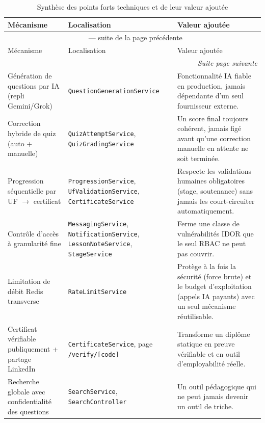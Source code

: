 \begin{center}
  \footnotesize
  \begin{longtable}{|p{2.6cm}|p{4.1cm}|p{6.3cm}|}
    \caption{Synthèse des points forts techniques et de leur valeur ajoutée}
    \label{tab:synthese-points-forts}\\
    \hline
    Mécanisme & Localisation & Valeur ajoutée \\
    \hline
    \endfirsthead
    \multicolumn{3}{c}{\tablename~\thetable{} --- suite de la page précédente}\\
    \hline
    Mécanisme & Localisation & Valeur ajoutée \\
    \hline
    \endhead
    \hline \multicolumn{3}{r}{\textit{Suite page suivante}} \\
    \endfoot
    \hline
    \endlastfoot
    Génération de questions par IA (repli Gemini/Grok) & \texttt{Question\allowbreak Generation\allowbreak Service} & Fonctionnalité IA fiable en production, jamais dépendante d'un seul fournisseur externe. \\ \hline
    Correction hybride de quiz (auto + manuelle) & \texttt{QuizAttempt\allowbreak Service}, \texttt{QuizGrading\allowbreak Service} & Un score final toujours cohérent, jamais figé avant qu'une correction manuelle en attente ne soit terminée. \\ \hline
    Progression séquentielle par UF $\rightarrow$ certificat & \texttt{Progression\allowbreak Service}, \texttt{UfValidation\allowbreak Service}, \texttt{Certificate\allowbreak Service} & Respecte les validations humaines obligatoires (stage, soutenance) sans jamais les court-circuiter automatiquement. \\ \hline
    Contrôle d'accès à granularité fine & \texttt{Messaging\allowbreak Service}, \texttt{Notification\allowbreak Service}, \texttt{LessonNote\allowbreak Service}, \texttt{Stage\allowbreak Service} & Ferme une classe de vulnérabilités IDOR que le seul RBAC ne peut pas couvrir. \\ \hline
    Limitation de débit Redis transverse & \texttt{RateLimit\allowbreak Service} & Protège à la fois la sécurité (force brute) et le budget d'exploitation (appels IA payants) avec un seul mécanisme réutilisable. \\ \hline
    Certificat vérifiable publiquement + partage LinkedIn & \texttt{Certificate\allowbreak Service}, page \texttt{/verify/[code]} & Transforme un diplôme statique en preuve vérifiable et en outil d'employabilité réelle. \\ \hline
    Recherche globale avec confidentialité des questions & \texttt{Search\allowbreak Service}, \texttt{Search\allowbreak Controller} & Un outil pédagogique qui ne peut jamais devenir un outil de triche. \\ \hline

\end{longtable}
\end{center}
